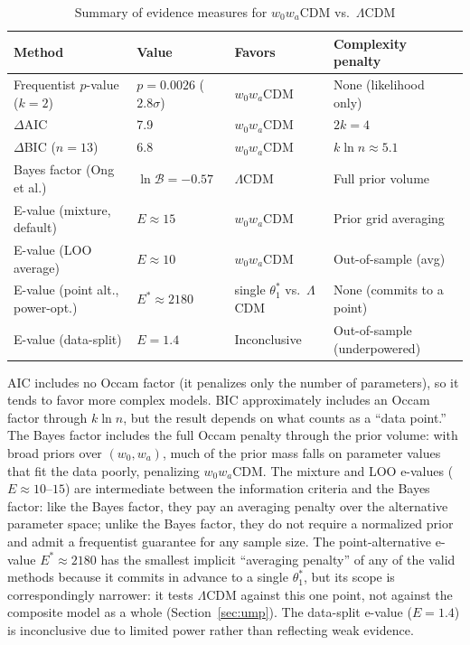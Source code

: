 \documentclass[11pt,a4paper]{article}
\newcommand{\LCDM}{$\Lambda$CDM}
\begin{document}
\begin{table}[H]
\centering
\caption{Summary of evidence measures for $w_0w_a$CDM vs.\ \LCDM}
\label{tab:evidence_summary}
\begin{tabular}{@{}llll@{}}
\toprule
\textbf{Method} & \textbf{Value} & \textbf{Favors} & \textbf{Complexity penalty} \\
\midrule
Frequentist $p$-value ($k=2$) & $p = 0.0026$ ($2.8\sigma$) & $w_0w_a$CDM & None (likelihood only) \\
$\Delta$AIC & 7.9 & $w_0w_a$CDM & $2k = 4$ \\
$\Delta$BIC ($n=13$) & 6.8 & $w_0w_a$CDM & $k\ln n \approx 5.1$ \\
Bayes factor (Ong et al.) & $\ln\mathcal{B} = -0.57$ & \LCDM & Full prior volume \\
E-value (mixture, default) & $E \approx 15$ & $w_0w_a$CDM & Prior grid averaging \\
E-value (LOO average) & $E \approx 10$ & $w_0w_a$CDM & Out-of-sample (avg) \\
E-value (point alt., power-opt.) & $E^{*} \approx 2180$ & single $\theta_1^*$ vs.\ \LCDM & None (commits to a point) \\
E-value (data-split) & $E = 1.4$ & Inconclusive & Out-of-sample (underpowered) \\
\bottomrule
\end{tabular}
\end{table}

\noindent AIC includes no Occam factor (it penalizes only the number of parameters), so it tends to favor more complex models. BIC approximately includes an Occam factor through $k\ln n$, but the result depends on what counts as a ``data point.'' The Bayes factor includes the full Occam penalty through the prior volume: with broad priors over $(w_0, w_a)$, much of the prior mass falls on parameter values that fit the data poorly, penalizing $w_0w_a$CDM. The mixture and LOO e-values ($E \approx 10$--$15$) are intermediate between the information criteria and the Bayes factor: like the Bayes factor, they pay an averaging penalty over the alternative parameter space; unlike the Bayes factor, they do not require a normalized prior and admit a frequentist guarantee for any sample size. The point-alternative e-value $E^{*} \approx 2180$ has the smallest implicit ``averaging penalty'' of any of the valid methods because it commits in advance to a single $\theta_1^*$, but its scope is correspondingly narrower: it tests \LCDM{} against this one point, not against the composite model as a whole (Section~\ref{sec:ump}). The data-split e-value ($E = 1.4$) is inconclusive due to limited power rather than reflecting weak evidence.
\end{document}
